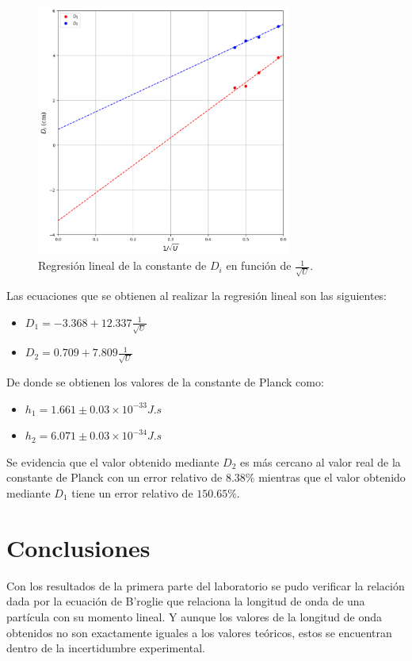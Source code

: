 \documentclass[10pt]{article}
\begin{document}
    \begin{figure}[h]
        \centering
        \includegraphics[width=3.3in]{img/regresion.png}
        \caption{Regresión lineal de la constante de $D_i$ en función de $\frac{1}{\sqrt{U}}$.}
        \label{fig:regresion}
    \end{figure}

    Las ecuaciones que se obtienen al realizar la regresión lineal son las siguientes:

    \begin{itemize}
        \item $D_1 = -3.368 + 12.337 \frac{1}{\sqrt{U}}$
        \item $D_2 = 0.709 + 7.809 \frac{1}{\sqrt{U}}$
    \end{itemize}

    De donde se obtienen los valores de la constante de Planck como:

    \begin{itemize}
        \item $h_1 = 1.661 \pm 0.03 \times 10^{-33} J.s$
        \item $h_2 = 6.071 \pm 0.03 \times 10^{-34} J.s$
    \end{itemize}

    Se evidencia que el valor obtenido mediante $D_2$ es más cercano al valor real de la constante de Planck con un error relativo de $8.38\%$ mientras que el valor obtenido mediante $D_1$ tiene un error relativo de $150.65\%$.

    \section{Conclusiones}
        Con los resultados de la primera parte del laboratorio se pudo verificar la relación dada por la ecuación de B’roglie que relaciona la longitud de onda de una partícula con su momento lineal. Y aunque los valores de la longitud de onda obtenidos no son exactamente iguales a los valores teóricos, estos se encuentran dentro de la incertidumbre experimental.
\end{document}
